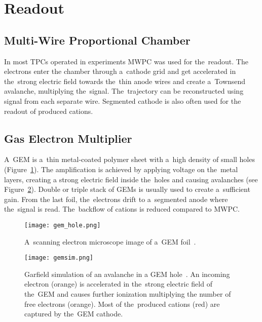 	\section{Readout}
		\subsection{Multi-Wire Proportional Chamber}
			In most \ac{TPC}s operated in experiments \acf{MWPC} was used for the~readout. The electrons enter the chamber through a~cathode grid and get accelerated in the~strong electric field towards the~thin anode wires and create a~Townsend avalanche, multiplying the~signal. The~trajectory can be reconstructed using signal from each separate wire. Segmented cathode is also often used for the readout of produced cations.
			
		\subsection{Gas Electron Multiplier}
			A~\acf{GEM} is a~thin metal-coated polymer sheet with a~high density of small holes (Figure~\ref{fig:gemhole}). The amplification is achieved by applying voltage on the~metal layers, creating a strong electric field inside the~holes and causing avalanches (see Figure~\ref{fig:gemsim}). Double or triple stack of \ac{GEM}s is usually used to create a~sufficient gain. From the last foil, the~electrons drift to a~segmented anode where the~signal is read. The~backflow of cations is reduced compared to \ac{MWPC}.
			\begin{figure}
				\centering
				\texttt{[image: gem\_hole.png]}
				\caption{A~scanning electron microscope image of a~\ac{GEM} foil~\cite{gemhole}.}
				\label{fig:gemhole}
			\end{figure}
			\begin{figure}
				\centering
				\texttt{[image: gemsim.png]}
				\caption{Garfield simulation of an avalanche in a \ac{GEM} hole~\cite{gemsim}. An incoming electron (orange) is accelerated in the~strong electric field of the~\ac{GEM} and causes further ionization multiplying the number of free electrons (orange). Most of the~produced cations (red) are captured by the~\ac{GEM} cathode.}
				\label{fig:gemsim}
			\end{figure}
		
